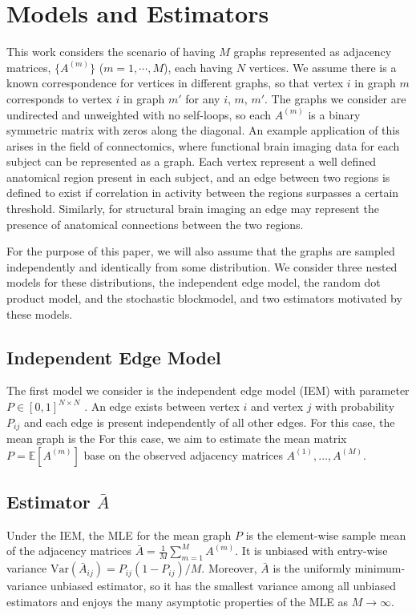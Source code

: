 \documentclass[10pt,letterpaper]{article}
\newcommand{\Ex}{\mathbb{E}}
\begin{document}
\section{Models and Estimators}
\label{section:model_estimator}
This work considers the scenario of having $M$ graphs represented as adjacency matrices, $\{A^{(m)}\}$ ($m = 1, \cdots, M$), each having $N$ vertices.
We assume there is a known correspondence for vertices in different graphs, so that vertex $i$ in graph $m$ corresponds to vertex $i$ in graph $m'$ for any $i$, $m$, $m'$.
The graphs we consider are undirected and unweighted with no self-loops, so each $A^{(m)}$ is a binary symmetric matrix with zeros along the diagonal. An example application of this arises in the field of connectomics, where functional brain imaging data for each subject can be represented as a graph.
Each vertex represent a well defined anatomical region present in each subject, and an edge between two regions is defined to exist if correlation in activity between the regions surpasses a certain threshold.
Similarly, for structural brain imaging an edge may represent the presence of anatomical connections between the two regions.

For the purpose of this paper, we will also assume that the graphs are sampled independently and identically from some distribution.
We consider three nested models for these distributions, the independent edge model, the random dot product model, and the stochastic blockmodel, and two estimators motivated by these models.



\subsection{Independent Edge Model}
The first model we consider is the independent edge model (IEM) with parameter $P \in [0,1]^{N\times N}$ \citep{bollobas2007phase}.
An edge exists between vertex $i$ and vertex $j$ with probability $P_{ij}$ and each edge is present independently of all other edges. 
For this case, the mean graph is the 
For this case, we aim to estimate the mean matrix $P=\Ex[A^{(m)}]$ base on the observed adjacency matrices $A^{(1)},\dotsc,A^{(M)}$.



\subsection{Estimator $\bar{A}$}
\label{sec:abar}
Under the IEM, the MLE for the mean graph $P$ is the element-wise sample mean of the adjacency matrices $\bar{A}=\frac{1}{M}\sum_{m=1}^M A^{(m)}$.
It is unbiased with entry-wise variance $\mathrm{Var}(\bar{A}_{ij}) = P_{ij} (1-P_{ij})/M$. Moreover, $\bar{A}$ is the uniformly minimum-variance unbiased estimator, so it has the smallest variance among all unbiased estimators and enjoys the many asymptotic properties of the MLE as $M\to \infty$.
\end{document}
